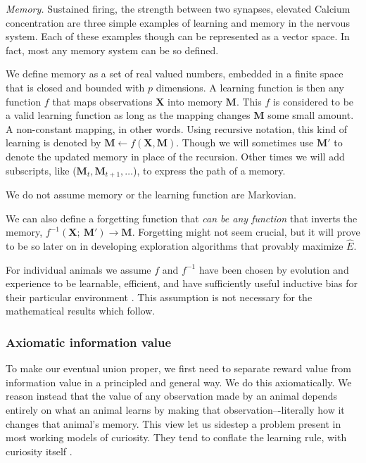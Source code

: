 \emph{Memory.} Sustained firing, the strength between two synapses, elevated Calcium concentration are three simple examples of learning and memory in the nervous system. Each of these examples though can be represented as a vector space. In fact, most any memory system can be so defined. 

We define memory as a set of real valued numbers, embedded in a finite space that is closed and bounded with $p$ dimensions. A learning function is then any function $f$ that maps observations $\mathbf{X}$ into memory $\mathbf{M}$. This $f$ is considered to be a valid learning function as long as the mapping changes $\mathbf{M}$ some small amount. A non-constant mapping, in other words. Using recursive notation, this kind of learning is denoted by $\mathbf{M} \leftarrow f(\mathbf{X},\mathbf{M}) $. Though we will sometimes use $\mathbf{M'}$ to denote the updated memory in place of the recursion. Other times we will add subscripts, like ($\mathbf{M}_t,\mathbf{M}_{t+1},\ldots$), to express the path of a memory.

We do not assume memory or the learning function are Markovian.

We can also define a forgetting function that \textit{can be any function} that inverts the memory, $f^{-1}(\mathbf{X};\ \mathbf{M}') \rightarrow \mathbf{M}$. Forgetting might not seem crucial, but it will prove to be so later on in developing exploration algorithms that provably maximize $\hat E$. 

For individual animals we assume $f$ and $f^{-1}$ have been chosen by evolution and experience to be learnable, efficient, and have sufficiently useful inductive bias for their particular environment \cite{Valiant1984,Thrun1992a}. This assumption is not necessary for the mathematical results which follow.


\subsubsection*{Axiomatic information value} 
To make our eventual union proper, we first need to separate reward value from information value in a principled and general way. We do this axiomatically.
We reason instead that the value of any observation made by an animal depends entirely on what an animal learns by making that observation–-literally how it changes that animal's memory. This view let us sidestep a problem present in most working models of curiosity. They tend to conflate the learning rule, with curiosity itself \cite{Schmidhuber1991b,Oudeyer2018a,Burda2018,Zhang2013,deAbril2018,Zhou2020,Schwartenbeck2019,Wilson2014a,Lehman2011,Velez2014}.

